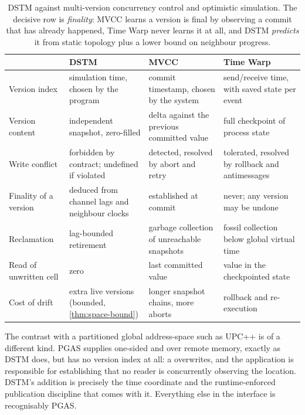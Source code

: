 \begin{table}[htbp]
\centering
\small
\begin{tabularx}{\textwidth}{@{}l >{\raggedright\arraybackslash}X
                                 >{\raggedright\arraybackslash}X
                                 >{\raggedright\arraybackslash}X@{}}
\toprule
 & \textbf{DSTM} & \textbf{MVCC} \cite{bernstein1981}
 & \textbf{Time Warp} \cite{jefferson1985} \\
\midrule
Version index
 & simulation time, chosen by the program
 & commit timestamp, chosen by the system
 & send/receive time, with saved state per event \\[2pt]
Version content
 & independent snapshot, zero-filled
 & delta against the previous committed value
 & full checkpoint of process state \\[2pt]
Write conflict
 & forbidden by contract; undefined if violated
 & detected, resolved by abort and retry
 & tolerated, resolved by rollback and antimessages \\[2pt]
Finality of a version
 & deduced from channel lags and neighbour clocks
 & established at commit
 & never; any version may be undone \\[2pt]
Reclamation
 & lag-bounded retirement
 & garbage collection of unreachable snapshots
 & fossil collection below global virtual time \\[2pt]
Read of unwritten cell
 & zero
 & last committed value
 & value in the checkpointed state \\[2pt]
Cost of drift
 & extra live versions (bounded, \cref{thm:space-bound})
 & longer snapshot chains, more aborts
 & rollback and re-execution \\
\bottomrule
\end{tabularx}
\caption{DSTM against multi-version concurrency control and optimistic
simulation. The decisive row is \emph{finality}: MVCC learns a version is
final by observing a commit that has already happened, Time Warp never learns
it at all, and DSTM \emph{predicts} it from static topology plus a lower bound
on neighbour progress.}
\label{tab:model-comparison}
\end{table}

The contrast with a partitioned global \gls{address-space} such as UPC++
\cite{upcxx2019} is of a different kind. PGAS supplies one-sided  and
 over remote memory, exactly as DSTM does, but has no version index
at all: a  overwrites, and the application is responsible for
establishing that no reader is concurrently observing the location. DSTM's
addition is precisely the time coordinate and the runtime-enforced
\gls{publication} discipline that comes with it. Everything else in the interface is
recognisably PGAS.
